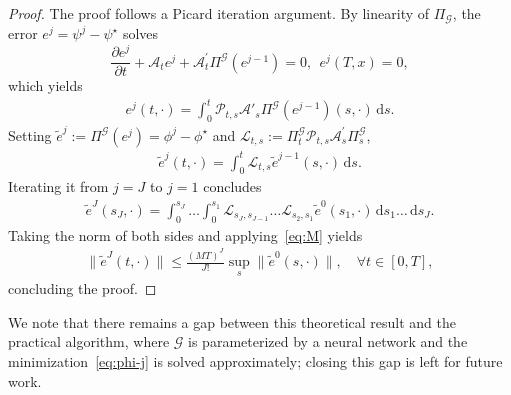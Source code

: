 \documentclass[letterpaper, 10 pt, conference]{ieeeconf}  %
\newtheorem{proposition}{Proposition}
\newcommand{\ud}{\,\mathrm{d}}
\begin{document}
\begin{proof}The proof follows a Picard iteration argument. By linearity of $\Pi_{\mathcal{G}}$, the error $e^j = \psi^j - \psi^\star$ 
solves
\begin{equation}\label{eq:error-pde}
    \frac{\partial e^j}{\partial t} + \mathcal A_t e^j + \mathcal A_t^\prime \Pi^{\mathcal G}(e^{j-1}) = 0,~~ e^j(T,x) = 0,
\end{equation}
which yields
\begin{align*}
    e^j(t,\cdot) = \int_0^t \mathcal P_{t,s} \mathcal A'_s \Pi^{\mathcal G} (e^{j-1})(s,\cdot) \ud s. 
\end{align*}
Setting $\tilde e^j:= \Pi^{\mathcal G}(e^j)=\phi^j-\phi^\star$ and $\mathcal L_{t,s}:= \Pi^{\mathcal G}_t \mathcal P_{t,s}\mathcal A^\prime_s  \Pi^{\mathcal G}_s$,
\begin{align*}
    \tilde e^j(t,\cdot) = \int_0^t \mathcal L_{t,s} \tilde e^{j-1}(s,\cdot) \ud s. 
\end{align*}
Iterating it from $j=J$ to $j=1$ concludes 
\begin{align*}
    \tilde e^J(s_J,\cdot) = \int_0^{s_J} \ldots \int_0^{s_1}\mathcal L_{s_J,s_{J-1}}  \ldots \mathcal L_{s_2,s_{1}} \tilde e^0(s_1,\cdot)\ud s_1\ldots\ud s_J. 
\end{align*}
Taking the norm of both sides and applying~\eqref{eq:M} yields
\begin{align*}
    \| \tilde e^J(t,\cdot)\| \leq \frac{(MT)^J}{J!} \sup_s \|\tilde e^{0}(s,\cdot)\|,\quad \forall t \in[0,T],
\end{align*}
concluding the proof. 
\end{proof}
We note that there remains a gap between this theoretical result and the 
practical algorithm, where $\mathcal{G}$ is parameterized by a neural network 
and the minimization~\eqref{eq:phi-j} is solved approximately; closing this 
gap is left for future work.
\end{document}
